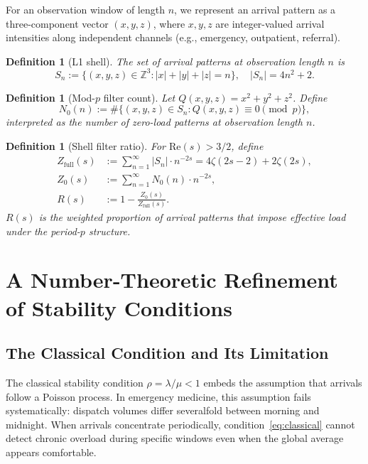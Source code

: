 \documentclass[12pt]{article}
\newtheorem{definition}[theorem]{Definition}
\begin{document}
For an observation window of length $n$, we represent an arrival pattern 
as a three-component vector $(x, y, z)$, where $x, y, z$ are integer-valued 
arrival intensities along independent channels (e.g., emergency, outpatient, 
referral).

\begin{definition}[L1 shell]
  The set of arrival patterns at observation length $n$ is
  \[
    S_n := \{(x,y,z) \in \mathbb{Z}^3 : |x|+|y|+|z| = n\},
    \quad |S_n| = 4n^2 + 2.
  \]
\end{definition}

\begin{definition}[Mod-$p$ filter count]
  Let $Q(x,y,z) = x^2+y^2+z^2$. Define
  \[
    N_0(n) := \#\{(x,y,z) \in S_n : Q(x,y,z) \equiv 0 \pmod{p}\},
  \]
  interpreted as the number of zero-load patterns at observation length $n$.
\end{definition}

\begin{definition}[Shell filter ratio]
  For $\mathrm{Re}(s) > 3/2$, define
  \begin{align*}
    Z_{\mathrm{full}}(s) &:= \sum_{n=1}^{\infty} |S_n| \cdot n^{-2s}
                          = 4\zeta(2s-2) + 2\zeta(2s),\\
    Z_0(s) &:= \sum_{n=1}^{\infty} N_0(n) \cdot n^{-2s},\\
    R(s)   &:= 1 - \frac{Z_0(s)}{Z_{\mathrm{full}}(s)}.
  \end{align*}
  $R(s)$ is the weighted proportion of arrival patterns that impose 
  effective load under the period-$p$ structure.
\end{definition}

\section{A Number-Theoretic Refinement of Stability Conditions}

\subsection{The Classical Condition and Its Limitation}

The classical stability condition $\rho = \lambda/\mu < 1$ embeds the 
assumption that arrivals follow a Poisson process. In emergency medicine, 
this assumption fails systematically: dispatch volumes differ severalfold 
between morning and midnight. When arrivals concentrate periodically, 
condition~\eqref{eq:classical} cannot detect chronic overload during 
specific windows even when the global average appears comfortable.
\end{document}
